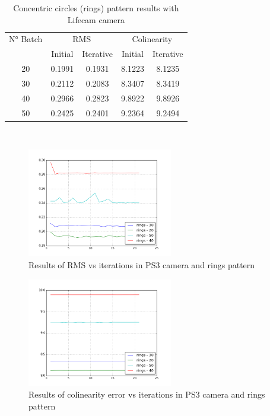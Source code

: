 \documentclass[journal]{IEEEtran}
\begin{document}
\begin{table}[h]
\centering
\caption{Concentric circles (rings) pattern results with Lifecam camera}
\begin{tabular}{ |c||c|c|c|c|  }
 \hline
 N° Batch & \multicolumn{2}{c|}{RMS} & \multicolumn{2}{c|}{Colinearity}\\
 \cline{2-5}
 & Initial & Iterative & Initial & Iterative \\
 \hline
 20        & 0.1991 & 0.1931 & 8.1223 & 8.1235 \\
 30        & 0.2112 & 0.2083 & 8.3407 & 8.3419 \\
 40        & 0.2966 & 0.2823 & 9.8922 & 9.8926 \\
 50        & 0.2425 & 0.2401 & 9.2364 & 9.2494 \\
 \hline
\end{tabular}
\\
\end{table}

\begin{figure}[H]
\centering
\includegraphics[width=2.5in]{_img/report_4/img_results_ps3_rings.png}
\caption{Results of RMS vs iterations in PS3 camera and rings pattern}
\end{figure}

\begin{figure}[H]
\centering
\includegraphics[width=2.5in]{_img/report_4/img_results_ps3_colinearity_rings.png}
\caption{Results of colinearity error vs iterations in PS3 camera and rings pattern}
\end{figure}
\end{document}
